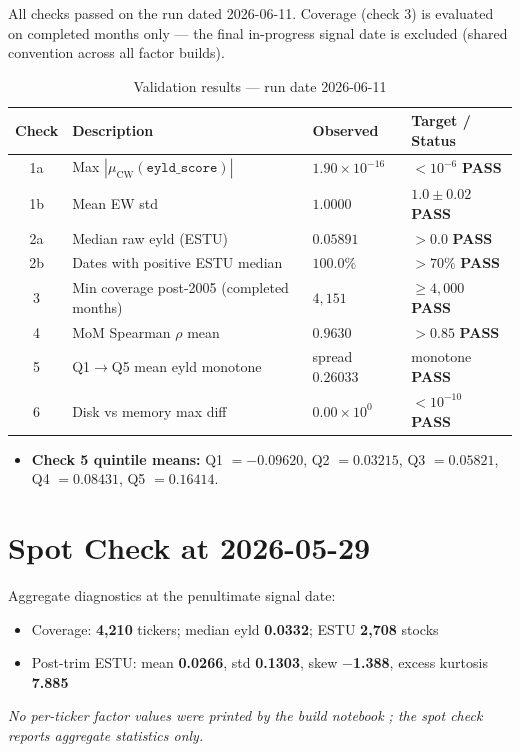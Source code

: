 \documentclass[11pt,a4paper]{article}
\newcommand{\PASS}[1]{\textcolor{pass}{\textbf{#1}}}
\newcommand{\NOTE}[1]{\textcolor{note}{\textit{#1}}}
\begin{document}
All checks passed on the run dated 2026-06-11. Coverage (check 3) is evaluated
on completed months only --- the final in-progress signal date is excluded
(shared convention across all factor builds).

\begin{table}[h!]
\centering
\caption{Validation results --- run date 2026-06-11}
\small
\begin{tabular}{clll}
\toprule
\textbf{Check} & \textbf{Description} & \textbf{Observed} & \textbf{Target / Status} \\
\midrule
1a & Max $|\mu_{\text{CW}}(\texttt{eyld\_score})|$ & $1.90\times10^{-16}$ & $<10^{-6}$ \quad \PASS{PASS} \\
1b & Mean EW std & $1.0000$ & $1.0\pm0.02$ \quad \PASS{PASS} \\
2a & Median raw eyld (ESTU) & $0.05891$ & $>0.0$ \quad \PASS{PASS} \\
2b & Dates with positive ESTU median & $100.0\%$ & $>70\%$ \quad \PASS{PASS} \\
3 & Min coverage post-2005 (completed months) & $4{,}151$ & $\geq4{,}000$ \quad \PASS{PASS} \\
4 & MoM Spearman $\rho$ mean & $0.9630$ & $>0.85$ \quad \PASS{PASS} \\
5 & Q1$\to$Q5 mean eyld monotone & spread $0.26033$ & monotone \quad \PASS{PASS} \\
6 & Disk vs memory max diff & $0.00\times10^{0}$ & $<10^{-10}$ \quad \PASS{PASS} \\
\bottomrule
\end{tabular}
\end{table}

\begin{itemize}[leftmargin=*,topsep=2pt,itemsep=2pt]
  \item \textbf{Check 5 quintile means:} Q1 $=-0.09620$, Q2 $=0.03215$, Q3 $=0.05821$, Q4 $=0.08431$, Q5 $=0.16414$.
\end{itemize}

\section{Spot Check at 2026-05-29}

Aggregate diagnostics at the penultimate signal date:

\begin{itemize}[leftmargin=*,topsep=2pt,itemsep=2pt]
  \item Coverage: \textbf{4{,}210} tickers; median eyld \textbf{0.0332}; ESTU \textbf{2{,}708} stocks
  \item Post-trim ESTU: mean \textbf{0.0266}, std \textbf{0.1303}, skew \textbf{$-$1.388}, excess kurtosis \textbf{7.885}
\end{itemize}

\NOTE{No per-ticker factor values were printed by the build notebook
; the spot check reports aggregate statistics only.}
\end{document}

